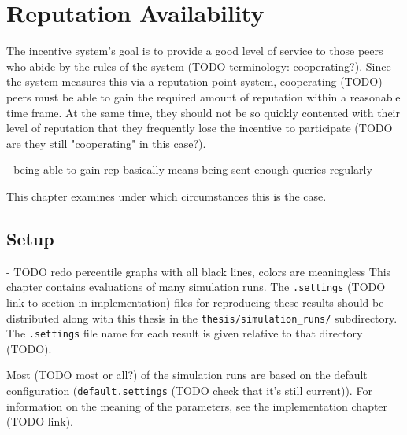 \chapter{Reputation Availability}
The incentive system's goal is to provide a good level of service to those peers
who abide by the rules of the system (TODO terminology: cooperating?). Since the
system measures this via a reputation point system, cooperating (TODO) peers
must be able to gain the required amount of reputation within a reasonable time
frame. At the same time, they should not be so quickly contented with their
level of reputation that they frequently lose the incentive to participate (TODO
are they still "cooperating" in this case?).

- being able to gain rep basically means being sent enough queries regularly

This chapter examines under which circumstances this is the case.

\section{Setup}
- TODO redo percentile graphs with all black lines, colors are meaningless
This chapter contains evaluations of many simulation runs. The
\texttt{.settings} (TODO link to section in implementation) files for
reproducing these results should be distributed along with this thesis in the
\texttt{thesis/simulation\_runs/} subdirectory. The \texttt{.settings} file name
for each result is given relative to that directory (TODO).

Most (TODO most or all?) of the simulation runs are based on the default
configuration (\texttt{default.settings} (TODO check that it's still current)).
For information on the meaning of the parameters, see the implementation chapter
(TODO link).

